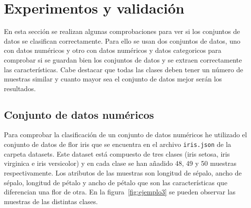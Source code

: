 \documentclass[a4paper, 12pt]{book}
\begin{document}

\cleardoublepage
\chapter{Experimentos y validación}

En esta sección se realizan algunas comprobaciones para ver si los conjuntos de datos se clasifican correctamente.
Para ello se usan dos conjuntos de datos, uno con datos numéricos y otro con datos numéricos y datos categoricos para comprobar si se guardan bien los conjuntos de datos y se extraen correctamente las características. 
Cabe destacar que todas las clases deben tener un número de muestras similar y cuanto mayor sea el conjunto de datos mejor serán los resultados.

\section{Conjunto de datos numéricos}
\label{subsec:numericos}

Para comprobar la clasificación de un conjunto de datos numéricos he utilizado el conjunto de datos de flor iris que se encuentra en el archivo \texttt{iris.json} de la carpeta datasets. Este dataset está compuesto de tres clases (iris setosa, iris virginica e iris versicolor) y en cada clase se han añadido 48, 49 y 50 muestras respectivamente. 
Los atributos de las muestras son longitud de sépalo, ancho de sépalo, longitud de pétalo y ancho de pétalo que son las características que diferencian una flor de otra. 
En la figura~\ref{fig:ejemplo3} se pueden observar las muestras de las distintas clases.
\end{document}
